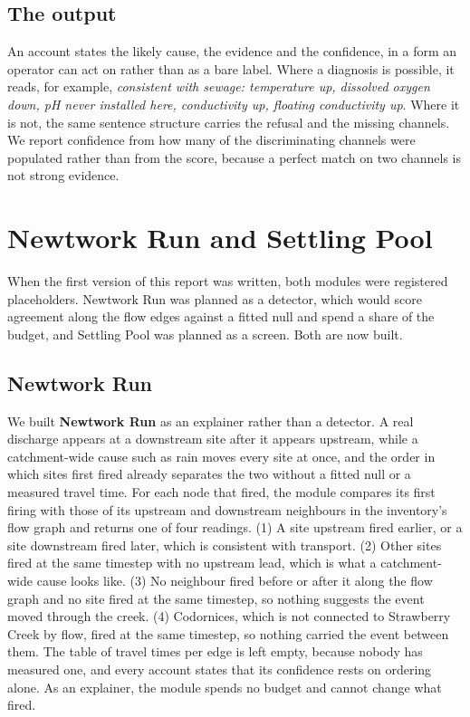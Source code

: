 \documentclass{article}
\begin{document}
\subsection{The output}

An account states the likely cause, the evidence and the confidence, in a form
an operator can act on rather than as a bare label. Where a diagnosis is
possible, it reads, for example, \emph{consistent with sewage: temperature up,
dissolved oxygen down, pH never installed here, conductivity up, floating
conductivity up}. Where it is not, the same sentence structure carries the refusal and the
missing channels. We report confidence from how many of the discriminating
channels were populated rather than from the score, because a perfect match on
two channels is not strong evidence.

\section{Newtwork Run and Settling Pool}
\label{sec:pending}

When the first version of this report was written, both modules were
registered placeholders. Newtwork Run was planned as a detector, which would
score agreement along the flow edges against a fitted null and spend a share
of the budget, and Settling Pool was planned as a screen. Both are now built.

\subsection{Newtwork Run}

We built \textbf{Newtwork Run} as an explainer rather than a detector. A real
discharge appears at a downstream site after it appears upstream, while a
catchment-wide cause such as rain moves every site at once, and the order in
which sites first fired already separates the two without a fitted null or a
measured travel time. For each node that fired, the module compares its first
firing with those of its upstream and downstream neighbours in the inventory's
flow graph and returns one of four readings. (1) A site upstream fired
earlier, or a site downstream fired later, which is consistent with transport.
(2) Other sites fired at the same timestep with no upstream lead, which is what
a catchment-wide cause looks like. (3) No neighbour fired before or after it along
the flow graph and no site fired at the same timestep, so nothing suggests the
event moved through the creek. (4) Codornices, which is not connected to
Strawberry Creek by flow, fired at the same timestep, so nothing carried the
event between them. The table of travel times per edge is left empty, because
nobody has measured one, and every account states that its confidence rests
on ordering alone. As an explainer, the module spends no budget and cannot
change what fired.
\end{document}
